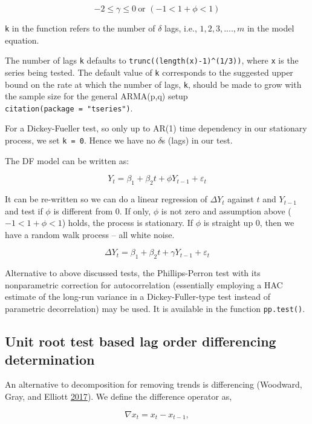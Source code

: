 \documentclass[
  12pt,
]{article}
\begin{document}
\[
-2 \leq \gamma \leq 0\ \text{or } (-1 < 1+\phi < 1)
\]

\texttt{k} in the function refers to the number of \(\delta\) lags, i.e., \(1, 2, 3, ...., m\) in the model equation.

The number of lags \texttt{k} defaults to \texttt{trunc((length(x)-1)\^{}(1/3))}, where \texttt{x} is the series being tested. The default value of \texttt{k} corresponds to the suggested upper bound on the rate at which the number of lags, \texttt{k}, should be made to grow with the sample size for the general ARMA(p,q) setup \texttt{citation(package\ =\ "tseries")}.

For a Dickey-Fueller test, so only up to AR(1) time dependency in our stationary process, we set \texttt{k\ =\ 0}. Hence we have no \(\delta\)s (lags) in our test.

The DF model can be written as:

\[
Y_t = \beta_1 + \beta_2 t + \phi Y_{t-1} + \varepsilon_t
\]

It can be re-written so we can do a linear regression of \(\Delta Y_t\) against \(t\) and \(Y_{t-1}\) and test if \(\phi\) is different from 0. If only, \(\phi\) is not zero and assumption above (\(-1 < 1+\phi < 1\)) holds, the process is stationary. If \(\phi\) is straight up 0, then we have a random walk process -- all white noise.

\[
\Delta {Y}_{t}=\beta_1+\beta_2 t+\gamma {Y}_{t-1} + \varepsilon_{t}
\]

Alternative to above discussed tests, the Phillips-Perron test with its nonparametric correction for autocorrelation (essentially employing a HAC estimate of the long-run variance in a Dickey-Fuller-type test instead of parametric decorrelation) may be used. It is available in the function \texttt{pp.test()}.

\hypertarget{unit-root-test-based-lag-order-differencing-determination}{%
\subsection{Unit root test based lag order differencing determination}\label{unit-root-test-based-lag-order-differencing-determination}}

An alternative to decomposition for removing trends is differencing (Woodward, Gray, and Elliott \protect\hyperlink{ref-woodward2017applied}{2017}). We define the difference operator as,

\begin{equation}
\nabla x_t = x_t - x_{t-1},
\label{eqn:difference-operator}
\end{equation}
\end{document}
